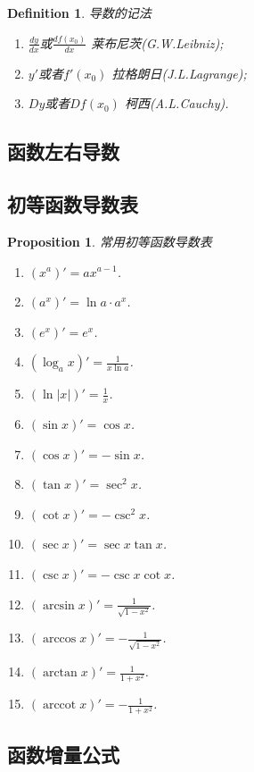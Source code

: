 \documentclass{article}
\newtheorem{proposition}[theorem]{Proposition}
\newtheorem{definition}[theorem]{Definition}
\DeclareMathOperator{\arccot}{arccot}
\begin{document}
\begin{definition}
\rm {\color{red} 导数的记法}
\begin{enumerate}
	\item $\frac{dy}{dx}$或$\frac{df(x_0)}{dx}$ 莱布尼茨(G.W.Leibniz);
	\item $y'$或者$f'(x_0)$ 拉格朗日(J.L.Lagrange);
	\item $Dy$或者$Df(x_0)$ 柯西(A.L.Cauchy).
\end{enumerate}
\end{definition}

\subsection{函数左右导数}

\newpage
\subsection{初等函数导数表}

\begin{proposition} \rm 常用初等函数导数表 
\begin{enumerate} 
	\item $(x^a)' = ax^{a-1}$.
	\item $(a^x)' = \ln a\cdot a^x $.
	\item $(e^x)' = e^x$.
	\item $(\log_a x)' = \frac{1}{x\ln a}$.
	\item $(\ln |x|)' = \frac{1}{x}$.
	\item $(\sin x)' = \cos x$.
	\item $(\cos x)' = -\sin x$.
	\item $(\tan x)' = \sec^2 x$.
	\item $(\cot x)' = -\csc^2 x$.
	\item $(\sec x)' = \sec x \tan x$.
	\item $(\csc x)' = -\csc x \cot x$.
	\item $(\arcsin x)' = \frac{1}{\sqrt{1-x^2}}$.
	\item $(\arccos x)' = -\frac{1}{\sqrt{1-x^2}}$.
	\item $(\arctan x)' = \frac{1}{1+x^2}$.
	\item $(\arccot x)' = -\frac{1}{1+x^2}$.
\end{enumerate}
\end{proposition}

\newpage
\subsection{函数增量公式}
\end{document}
